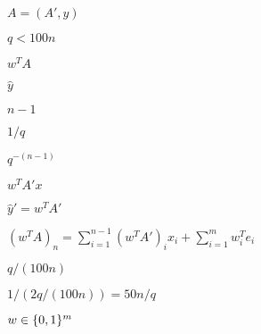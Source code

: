 \documentclass[10pt]{book}
\begin{document}
\begin{mdSnippets}
\begin{mdInlineSnippet}
$A = (A', y)$\end{mdInlineSnippet}%
\begin{mdInlineSnippet}[7d2dc545b8858c87f90fb56736cff547]%
$q < 100 n$\end{mdInlineSnippet}%
\begin{mdInlineSnippet}[35ad0f312e16c4c91b0236b07724eb91]%
$w^T A$\end{mdInlineSnippet}%
\begin{mdInlineSnippet}[5d28a7ba1a44a73b8c2ed21321697c59]%
$\hat{y}$\end{mdInlineSnippet}%
\begin{mdInlineSnippet}%
$n - 1$\end{mdInlineSnippet}%
\begin{mdInlineSnippet}%
$1/q$\end{mdInlineSnippet}%
\begin{mdInlineSnippet}[20df1ade5591d55644d372e8c32bf71d]%
$q^{-(n-1)}$\end{mdInlineSnippet}%
\begin{mdInlineSnippet}[dd84bc1042fd1f92da2eb83be85e00a0]%
$w^T A' x$\end{mdInlineSnippet}%
\begin{mdInlineSnippet}[851508353f31ef8f0556c038ac620b0f]%
$\hat{y}' = w^T A'$\end{mdInlineSnippet}%
\begin{mdInlineSnippet}[b062776b93ca9c701f7c4e0f0099619f]%
$(w^T A)_n = \sum_{i=1}^{n-1} (w^T A')_i x_i + \sum_{i=1}^{m} w^T_i e_i$\end{mdInlineSnippet}%
\begin{mdInlineSnippet}%
$q /(100 n)$\end{mdInlineSnippet}%
\begin{mdInlineSnippet}[2d90425c891d2577b19b0b9a19e61963]%
$1 / (2q / (100 n)) = 50n/q$\end{mdInlineSnippet}%
\begin{mdInlineSnippet}[659ef31666ec84e61f95f7e3500c105a]%
$w \in \{0,1\}^m$\end{mdInlineSnippet}%
\begin{mdInlineSnippet}%

\end{mdInlineSnippet}
\end{mdSnippets}
\end{document}
